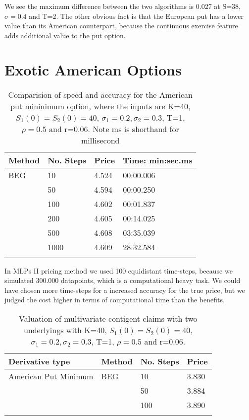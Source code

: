 We see the maximum difference between the two algorithms is 0.027 at S=38, $\sigma=0.4$ and T=2. The other obvious fact is that the European put has a lower value than its American counterpart, because the continuous exercise feature adds additional value to the put option. 




\section{Exotic American Options}


\begin{table}[th]
\caption{Comparision of speed and accuracy for the American put mininimum option, where the inputs are K=40, $S_1(0)=S_2(0)=40$, $\sigma_1=0.2, \sigma_2=0.3$, T=1, $\rho=0.5$  and r=0.06. Note ms is shorthand for millisecond}
\label{tab:TradeOffAmerMin}
\centering
\begin{tabular}{l l l l}
\toprule
\textbf{Method} & \textbf{No. Steps} & \textbf{Price} & \textbf{Time: min:sec.ms} \\
\midrule
BEG & 10 & 4.524 & 00:00.006\\
& 50 & 4.594 & 00:00.250\\
& 100 & 4.602 & 00:01.837\\
& 200 & 4.605 & 00:14.025\\
& 500 & 4.608 & 03:35.039\\
& 1000 & 4.609 & 28:32.584\\
\bottomrule\\
\end{tabular}
\end{table}
 In MLPs II pricing method we used 100 equidistant time-steps, because we simulated 300.000 datapoints, which is a computational heavy task. We could have chosen more time-steps for a increased accuracy for the true price, but we judged the cost higher in terms of computational time than the benefits. 

\begin{table}[th]
\caption{Valuation of multivariate contigent claims with two underlyings with K=40, $S_1(0)=S_2(0)=40$, $\sigma_1=0.2, \sigma_2=0.3$, T=1, $\rho=0.5$  and r=0.06.}
\label{tab:PriceAmericanPut}
\centering
\begin{tabular}{l l l l}
\toprule
\textbf{Derivative type} & \textbf{Method} & \textbf{No. Steps} & \textbf{Price} \\
\midrule
American Put Minimum & BEG & 10 & 3.830\\
 &  & 50 & 3.884\\
 &  & 100 & 3.890\\
\bottomrule\\
\end{tabular}
\end{table}





